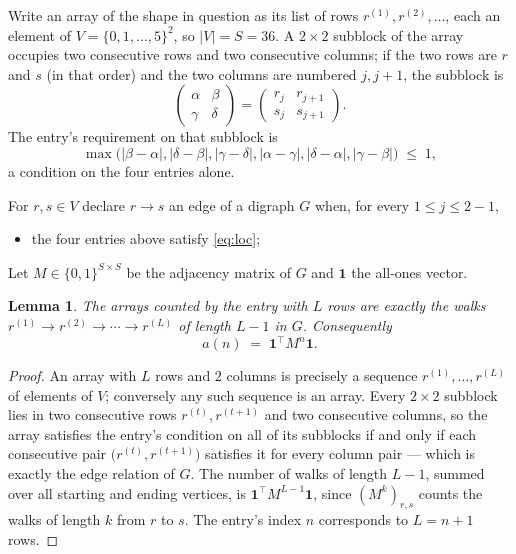 \documentclass[11pt,a4paper]{article}
\theoremstyle{plain}
\newtheorem{lemma}[theorem]{Lemma}
\theoremstyle{definition}
\begin{document}
Write an array of the shape in question as its list of rows
$r^{(1)},r^{(2)},\dots$, each an element of
$V=\{0,1,\dots,5\}^{2}$, so $|V|=S=36$. A $2\times2$ subblock of the array
occupies two consecutive rows and two consecutive columns; if the two rows are $r$
and $s$ (in that order) and the two columns are numbered $j,j+1$,
the subblock is
\[
\begin{pmatrix}\alpha&\beta\\\gamma&\delta\end{pmatrix}=\begin{pmatrix}r_j&r_{j+1}\\s_j&s_{j+1}\end{pmatrix}.
\]
The entry's requirement on that subblock is
\begin{equation}\label{eq:loc}
\max\bigl(|\beta-\alpha|,|\delta-\beta|,|\gamma-\delta|,|\alpha-\gamma|,|\delta-\alpha|,|\gamma-\beta|\bigr)\;\le\;1,
\end{equation}
a condition on the four entries alone.

For $r,s\in V$ declare $r\to s$ an edge of a digraph $G$ when, for every
$1\le j\le 2-1$,
\begin{itemize}
\item the four entries above satisfy \eqref{eq:loc};

\end{itemize}
Let $M\in\{0,1\}^{S\times S}$ be the adjacency matrix of $G$ and $\mathbf{1}$ the
all-ones vector.

\begin{lemma}\label{lem:walk}
The arrays counted by the entry with $L$ rows are exactly the walks
$r^{(1)}\to r^{(2)}\to\cdots\to r^{(L)}$ of length $L-1$ in $G$. Consequently
\[
a(n)\;=\;\mathbf{1}^{\!\top}M^{n}\mathbf{1} .
\]
\end{lemma}

\begin{proof}
An array with $L$ rows and $2$ columns is precisely a sequence
$r^{(1)},\dots,r^{(L)}$ of elements of $V$; conversely any such sequence is an array.
Every $2\times2$ subblock lies in two consecutive rows $r^{(t)},r^{(t+1)}$ and two
consecutive columns, so the array satisfies the entry's condition on all of its subblocks
if and only if each consecutive pair $\bigl(r^{(t)},r^{(t+1)}\bigr)$ satisfies it for
every column pair --- which is exactly the edge relation of $G$. The number of walks of
length $L-1$, summed over all starting and ending vertices, is
$\mathbf{1}^{\!\top}M^{L-1}\mathbf{1}$, since $(M^{k})_{r,s}$ counts the walks of
length $k$ from $r$ to $s$. The entry's index $n$ corresponds to $L=n+1$ rows.
\end{proof}
\end{document}
